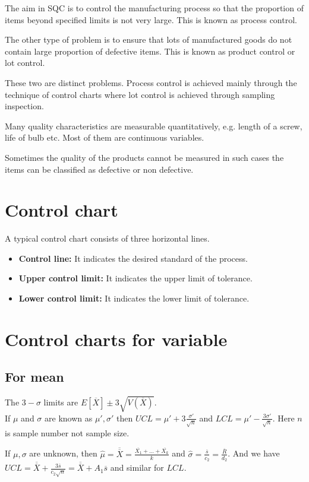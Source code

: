 \documentclass[oneside,11pt,pdftex]{book}%
\numberwithin{equation}{section}
\numberwithin{section}{chapter}
\numberwithin{equation}{chapter}
\begin{document}
The aim in SQC is to control the manufacturing process so that the proportion of items beyond specified limits is not very large. This is known as process control.\par
The other type of problem is to ensure that lots of manufactured goods do not contain large proportion of defective items. This is known as product control or lot control.\par
These two are distinct problems.
Process control is achieved mainly through the technique of control charts where lot control is achieved through sampling inspection.\par
Many quality characteristics are measurable quantitatively, e.g. length of a screw, life of bulb etc. Most of them are continuous variables.
\par
Sometimes the quality of the products cannot be measured in such cases the items can be classified as defective or non defective.
\section{Control chart}
A typical control chart consists of three horizontal lines. 
\begin{itemize}
	\item \textbf{Control line: }It indicates the desired standard of the process. 
	\item \textbf{Upper control limit: }It indicates the upper limit of tolerance.
	\item \textbf{Lower control limit: }It indicates the lower limit of tolerance.
\end{itemize}

\section{Control charts for variable}
\subsection{For mean}
The $ 3-\sigma  $ limits are $ E[\overline{X}] \pm 3 \sqrt{V(\overline{X})}$.\\
If $ \mu  $ and $ \sigma  $ are known as $ \mu', \sigma'$ then $ UCL=\mu'+3\frac{\sigma'}{\sqrt{n}} $ and $ LCL=\mu'-\frac{3\sigma'}{\sqrt{n}} $. Here $ n $ is sample number not sample size.\par
If $ \mu, \sigma  $ are unknown, then $ \hat{\mu } = \overline{\overline{X}}=\frac{\overline{X_1}+\dots+\overline{X_k}}{k}$ and $ \hat{\sigma } = \frac{\overline{s}}{c_2}=\frac{\overline{R}}{d_2}$. And we have $ UCL=\overline{\overline{X}} +\frac{3 \overline{s}}{c_2 \sqrt{n}}=\overline{\overline{X}}+A_1\overline{s}$ and similar for $ LCL $.
\end{document}
